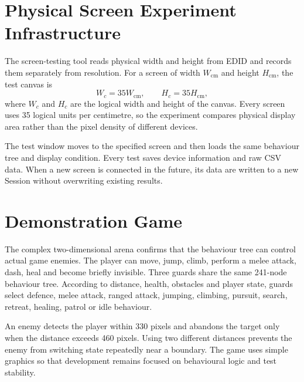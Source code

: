 \section{Physical Screen Experiment Infrastructure}

The screen-testing tool reads physical width and height from EDID and records them separately from resolution. For a screen of width \(W_{\mathrm{cm}}\) and height \(H_{\mathrm{cm}}\), the test canvas is
\[
W_c=35W_{\mathrm{cm}}, \qquad H_c=35H_{\mathrm{cm}},
\]
where \(W_c\) and \(H_c\) are the logical width and height of the canvas. Every screen uses 35 logical units per centimetre, so the experiment compares physical display area rather than the pixel density of different devices.

The test window moves to the specified screen and then loads the same behaviour tree and display condition. Every test saves device information and raw CSV data. When a new screen is connected in the future, its data are written to a new Session without overwriting existing results.

\section{Demonstration Game}

The complex two-dimensional arena confirms that the behaviour tree can control actual game enemies. The player can move, jump, climb, perform a melee attack, dash, heal and become briefly invisible. Three guards share the same 241-node behaviour tree. According to distance, health, obstacles and player state, guards select defence, melee attack, ranged attack, jumping, climbing, pursuit, search, retreat, healing, patrol or idle behaviour.

An enemy detects the player within 330 pixels and abandons the target only when the distance exceeds 460 pixels. Using two different distances prevents the enemy from switching state repeatedly near a boundary. The game uses simple graphics so that development remains focused on behavioural logic and test stability.
